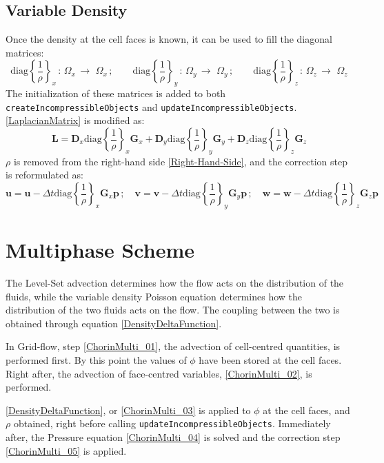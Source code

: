 \documentclass[11pt, a4paper, oneside, openany]{book}
\begin{document}
\subsection{Variable Density}\label{Subsection_Variable_Density}
Once the density at the cell faces is known, it can be used to fill the diagonal matrices:
\begin{equation*}
\mathrm{diag}\left\{\dfrac{1}{\rho}\right\}_{x}\,:\,\Omega_{x}\,\longrightarrow\,\,\Omega_{x}\,;\quad\quad\mathrm{diag}\left\{\dfrac{1}{\rho}\right\}_{y}\,:\,\Omega_{y}\,\longrightarrow\,\,\Omega_{y}\,;\quad\quad\mathrm{diag}\left\{\dfrac{1}{\rho}\right\}_{z}\,:\,\Omega_{z}\,\longrightarrow\,\,\Omega_{z}
\end{equation*}
The initialization of these matrices is added to both \texttt{\small createIncompressibleObjects} and \texttt{\small updateIncompressibleObjects}. \eqref{LaplacianMatrix} is modified as:
\begin{equation*}
\boldsymbol{L}=\boldsymbol{D}_{x}\mathrm{diag}\left\{\dfrac{1}{\rho}\right\}_{x}\boldsymbol{G}_{x}+\boldsymbol{D}_{y}\mathrm{diag}\left\{\dfrac{1}{\rho}\right\}_{y}\boldsymbol{G}_{y}+\boldsymbol{D}_{z}\mathrm{diag}\left\{\dfrac{1}{\rho}\right\}_{z}\boldsymbol{G}_{z}\label{LaplacianMatrixVarRho}
\end{equation*}
$\rho$ is removed from the right-hand side \eqref{Right-Hand-Side}, and the correction step is reformulated as:
\begin{equation*}
\boldsymbol{u}=\boldsymbol{u}-\Delta t\mathrm{diag}\left\{\dfrac{1}{\rho}\right\}_{x}\boldsymbol{G}_{x}\boldsymbol{p}\,;\quad\boldsymbol{v}=\boldsymbol{v}-\Delta t\mathrm{diag}\left\{\dfrac{1}{\rho}\right\}_{y}\boldsymbol{G}_{y}\boldsymbol{p}\,;\quad\boldsymbol{w}=\boldsymbol{w}-\Delta t\mathrm{diag}\left\{\dfrac{1}{\rho}\right\}_{z}\boldsymbol{G}_{z}\boldsymbol{p}
\end{equation*}
\section{Multiphase Scheme}\label{Chapter_Implementation_Multiphase_Scheme}
The Level-Set advection determines how the flow acts on the distribution of the fluids, while the variable density Poisson equation determines how the distribution of the two fluids acts on the flow. The coupling between the two is obtained through equation \eqref{DensityDeltaFunction}.\par
In Grid-flow, step \eqref{ChorinMulti_01}, the advection of cell-centred quantities, is performed first. By this point the values of $\phi$ have been stored at the cell faces. Right after, the advection of face-centred variables, \eqref{ChorinMulti_02}, is performed.\par
\eqref{DensityDeltaFunction}, or \eqref{ChorinMulti_03} is applied to $\phi$ at the cell faces, and  $\rho $ obtained, right before calling \texttt{\small updateIncompressibleObjects}. Immediately after, the Pressure equation \eqref{ChorinMulti_04} is solved and the correction step \eqref{ChorinMulti_05} is applied.
\end{document}
